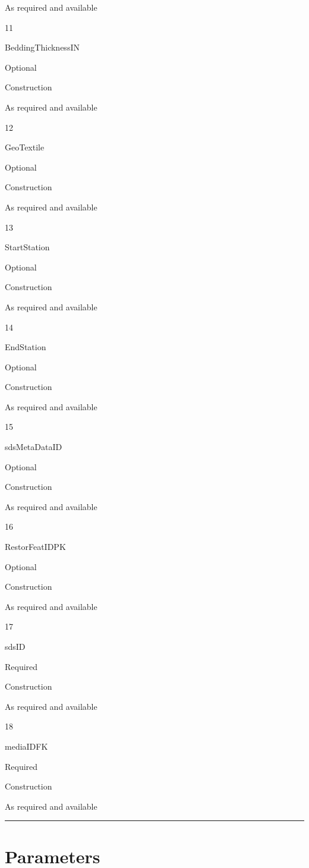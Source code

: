 \documentclass[
  letterpaper,
  DIV=11,
  numbers=noendperiod]{scrreprt}
\begin{document}
As required and available

11

BeddingThicknessIN

Optional

Construction

As required and available

12

GeoTextile

Optional

Construction

As required and available

13

StartStation

Optional

Construction

As required and available

14

EndStation

Optional

Construction

As required and available

15

sdsMetaDataID

Optional

Construction

As required and available

16

RestorFeatIDPK

Optional

Construction

As required and available

17

sdsID

Required

Construction

As required and available

18

mediaIDFK

Required

Construction

As required and available

\begin{center}\rule{0.5\linewidth}{0.5pt}\end{center}

\section{Parameters}\label{parameters-11}
\end{document}
